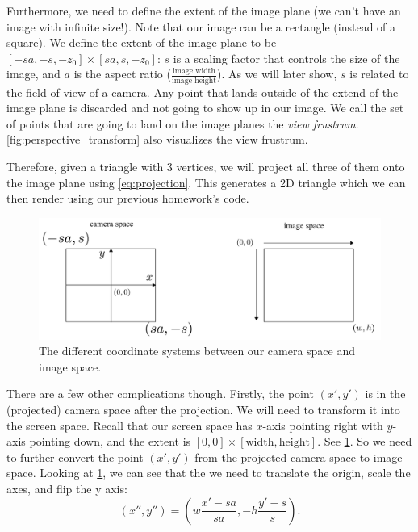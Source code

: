 Furthermore, we need to define the extent of the image plane (we can't have an image with infinite size!). Note that our image can be a rectangle (instead of a square). We define the extent of the image plane to be $[-sa, -s, -z_0] \times [sa, s, -z_0]$: $s$ is a scaling factor that controls the size of the image, and $a$ is the aspect ratio ($\frac{\text{image width}}{\text{image height}}$). As we will later show, $s$ is related to the \href{https://en.wikipedia.org/wiki/Field_of_view}{field of view} of a camera. Any point that lands outside of the extend of the image plane is discarded and not going to show up in our image. We call the set of points that are going to land on the image planes the \emph{view frustrum}. \cref{fig:perspective_transform} also visualizes the view frustrum.

Therefore, given a triangle with 3 vertices, we will project all three of them onto the image plane using \cref{eq:projection}. This generates a 2D triangle which we can then render using our previous homework's code.

\begin{figure}[h]
    \centering
    \includegraphics[width=0.9\linewidth]{imgs/camera_vs_image.pdf}
    \caption{The different coordinate systems between our camera space and image space.}
    \label{fig:camera_vs_image}
\end{figure}

There are a few other complications though. Firstly, the point $(x', y')$ is in the (projected) camera space after the projection. We will need to transform it into the screen space. Recall that our screen space has $x$-axis pointing right with $y$-axis pointing down, and the extent is $[0, 0] \times [\text{width}, \text{height}]$. See \cref{fig:camera_vs_image}. So we need to further convert the point $(x', y')$ from the projected camera space to image space. Looking at \cref{fig:camera_vs_image}, we can see that the we need to translate the origin, scale the axes, and flip the y axis:
\begin{equation}
(x'', y'') = (w\frac{x'-sa}{sa}, -h\frac{y'-s}{s}).
\end{equation}

